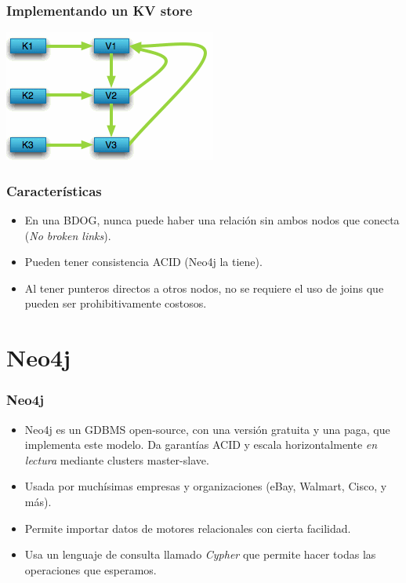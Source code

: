 \begin{frame}
\frametitle{Implementando un KV store}
 \center
 \includegraphics[width=0.9\linewidth,height=0.9\textheight,keepaspectratio]{bdog-4}
\end{frame}

\begin{frame}
\frametitle{Características}
\begin{itemize}
\item	En una BDOG, nunca puede haber una relación sin ambos nodos
	que conecta (\textit{No broken links}).
	\pause

\item	Pueden tener consistencia ACID (Neo4j la tiene).
	\pause

\item	Al tener punteros directos a otros nodos, no se requiere el uso
	de joins que pueden ser prohibitivamente costosos.
\end{itemize}
\end{frame}

\section{Neo4j}

\begin{frame}
\frametitle{Neo4j}
\begin{itemize}
\item	Neo4j es un GDBMS open-source, con una versión gratuita y una
	paga, que implementa este modelo. Da garantías ACID y escala
	horizontalmente \textit{en lectura} mediante clusters master-slave.
	\pause

\item	Usada por muchísimas empresas y organizaciones (eBay, Walmart,
	Cisco, y más).
	\pause

\item	Permite importar datos de motores relacionales con cierta
	facilidad.
	\pause

\item	Usa un lenguaje de consulta llamado \textit{Cypher} que permite
	hacer todas las operaciones que esperamos.
\end{itemize}
\end{frame}

